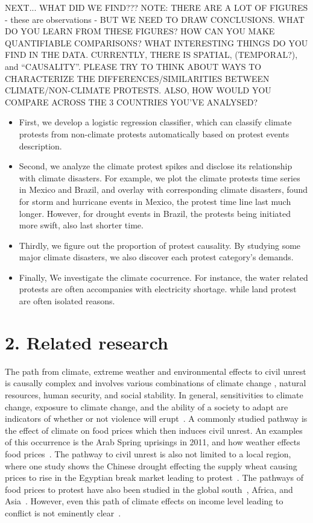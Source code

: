 \documentclass[9pt,twocolumn,twoside]{pnas-new}
\begin{document}
NEXT... WHAT DID WE FIND???
{\color{red}
NOTE: THERE ARE A LOT OF FIGURES - these are observations - BUT WE NEED TO DRAW CONCLUSIONS. WHAT DO YOU LEARN FROM THESE FIGURES? HOW CAN YOU MAKE QUANTIFIABLE COMPARISONS? WHAT INTERESTING THINGS DO YOU FIND IN THE DATA. CURRENTLY, THERE IS SPATIAL, (TEMPORAL?), and ``CAUSALITY''. PLEASE TRY TO THINK ABOUT WAYS TO CHARACTERIZE THE DIFFERENCES/SIMILARITIES BETWEEN CLIMATE/NON-CLIMATE PROTESTS. ALSO, HOW WOULD YOU COMPARE ACROSS THE 3 COUNTRIES YOU'VE ANALYSED?}

\begin{itemize}
  \item First, we develop a logistic regression classifier, which can classify climate protests from non-climate protests automatically based on protest events description.
  \item Second, we analyze the climate protest spikes and disclose its relationship with climate disasters. For example, we plot the climate protests time series in Mexico and Brazil, and overlay with corresponding climate disasters, found for storm and hurricane events in Mexico, the protest time line last much longer. However, for drought events in Brazil, the protests being initiated more swift, also last shorter time.
  \item Thirdly, we figure out the proportion of protest causality. By studying some major climate disasters, we also discover each protest category's demands.
  \item Finally, We investigate the climate cocurrence. For instance, the water related protests are often accompanies with electricity shortage.
while land protest are often isolated reasons.
\end{itemize}
%

%

%
%
\section{2. Related research}
The path from climate, extreme weather and environmental effects to civil unrest is causally complex \cite{hsiang2011civil,RW5} and involves various combinations of climate change \cite{burke2014climate}, natural resources, human security, and social stability.
In general, sensitivities to climate change, exposure to climate change, and the ability of a society to adapt are indicators of whether or not violence will erupt~\cite{RW9}.
A commonly studied pathway is the effect of climate on food prices which then induces civil unrest.
An examples of this occurrence is the Arab Spring uprisings in 2011, and how weather effects food prices~\cite{RW2}.
The pathway to civil unrest is also not limited to a local region, where one study shows the Chinese drought effecting the supply wheat causing prices to rise in the Egyptian break market leading to protest~\cite{RW1}.
The pathways of food prices to protest have also been studied in the global south~\cite{RW4}, Africa, and Asia~\cite{wischnath2014climate,RW6}.
However, even this path of climate effects on income level leading to conflict is not eminently clear~\cite{RW10}.
\end{document}

